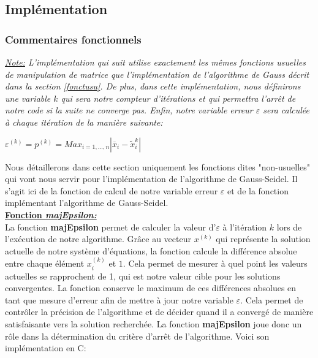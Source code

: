 \subsection{Implémentation}
\subsubsection{Commentaires fonctionnels}
\textit{\underline{Note:} L'implémentation qui suit utilise exactement les mêmes fonctions usuelles de manipulation de matrice que l'implémentation de l'algorithme de Gauss décrit dans la section \ref{fonctusu}. De plus, dans cette implémentation, nous définirons une variable $k$ qui sera notre compteur d'itérations et qui permettra l'arrêt de notre code si la suite ne converge pas. Enfin, notre variable erreur $\varepsilon$ sera calculée à chaque itération de la manière suivante:\\}
\begin{center}
  $\varepsilon^{(k)}=p^{(k)}=Max_{i=1,...,n}|\overline{x}_i-\widetilde{x}_i^k|$
\end{center}\vspace{8pt}
Nous détaillerons dans cette section uniquement les fonctions dites "non-usuelles" qui vont nous servir pour l'implémentation de l'algorithme de Gauss-Seidel. Il s'agit ici de la fonction de calcul de notre variable erreur $\varepsilon$ et de la fonction implémentant l'algorithme de Gauss-Seidel.\vspace{8pt}\\
\textbf{\underline{Fonction \textit{majEpsilon:}}}\vspace{6pt}\\
La fonction \textbf{majEpsilon} permet de calculer la valeur d'$\varepsilon$ à l'itération $k$ lors de l'exécution de notre algorithme. Grâce au vecteur $x^{(k)}$ qui représente la solution actuelle de notre système d'équations, la fonction calcule la différence absolue entre chaque élément $x_i^{(k)}$ et $1$. Cela permet de mesurer à quel point les valeurs actuelles se rapprochent de 1, qui est notre valeur cible pour les solutions convergentes. La fonction conserve le maximum de ces différences absolues en tant que mesure d'erreur afin de mettre à jour notre variable $\varepsilon$. Cela permet de contrôler la précision de l'algorithme et de décider quand il a convergé de manière satisfaisante vers la solution recherchée. La fonction \textbf{majEpsilon} joue donc un rôle dans la détermination du critère d'arrêt de l'algorithme. Voici son implémentation en C:

